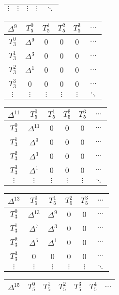 \begin{center}
\begin{tabular}{|c|cccc|}
	$\vdots$ & $\vdots$ & $\vdots$ & $\vdots$ & $\ddots$ \\\hline
\end{tabular}
\begin{tabular}{|c|ccccc|}
	\hline
	\textbf{$\Delta^9$} & \textbf{$T_5^0$} & \textbf{$T_5^1$} & \textbf{$T_5^2$} & \textbf{$T_5^3$} & \textbf{$\dots$} \\\hline
	$T_3^0$ & $\Delta^9$ & 0 & 0 & 0 & $\dots$ \\
	$T_3^1$ & $\Delta^3$ & 0 & 0 & 0 & $\dots$ \\
	$T_3^2$ & $\Delta^1$ & 0 & 0 & 0 & $\dots$ \\
	$T_3^3$ & 0 & 0 & 0 & 0 & $\dots$ \\
	$\vdots$ & $\vdots$ & $\vdots$ & $\vdots$ & $\vdots$ & $\ddots$ \\\hline
\end{tabular}
\begin{tabular}{|c|ccccc|}
	\hline
	\textbf{$\Delta^{11}$} & \textbf{$T_5^0$} & \textbf{$T_5^1$} & \textbf{$T_5^2$} & \textbf{$T_5^3$} & \textbf{$\dots$} \\\hline
	$T_3^0$ & $\Delta^{11}$ & 0 & 0 & 0 & $\dots$ \\
	$T_3^1$ & $\Delta^9$ & 0 & 0 & 0 & $\dots$ \\
	$T_3^2$ & $\Delta^3$ & 0 & 0 & 0 & $\dots$ \\
	$T_3^3$ & $\Delta^1$ & 0 & 0 & 0 & $\dots$ \\
	$\vdots$ & $\vdots$ & $\vdots$ & $\vdots$ & $\vdots$ & $\ddots$ \\\hline
\end{tabular}
\begin{tabular}{|c|ccccc|}
	\hline
	\textbf{$\Delta^{13}$} & \textbf{$T_5^0$} & \textbf{$T_5^1$} & \textbf{$T_5^2$} & \textbf{$T_5^3$} & \textbf{$\dots$} \\\hline
	$T_3^0$ & $\Delta^{13}$ & $\Delta^9$ & 0 & 0 & $\dots$ \\
	$T_3^1$ & $\Delta^7$ & $\Delta^3$ & 0 & 0 & $\dots$ \\
	$T_3^2$ & $\Delta^5$ & $\Delta^1$ & 0 & 0 & $\dots$ \\
	$T_3^3$ & 0 & 0 & 0 & 0 & $\dots$ \\
	$\vdots$ & $\vdots$ & $\vdots$ & $\vdots$ & $\vdots$ & $\ddots$ \\\hline
\end{tabular}
\begin{tabular}{|c|cccccc|}
	\hline
	\textbf{$\Delta^{15}$} & \textbf{$T_5^0$} & \textbf{$T_5^1$} & \textbf{$T_5^2$} & \textbf{$T_5^3$} & \textbf{$T_5^4$} & \textbf{$\dots$} \\\hline

\end{tabular}
\end{center}
